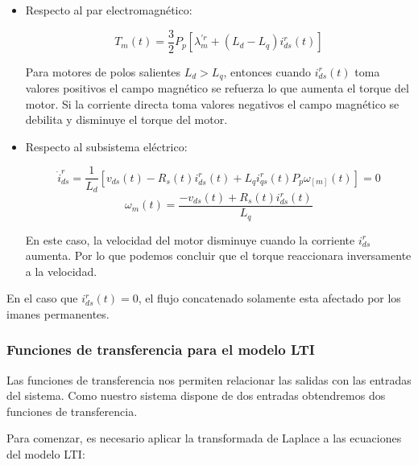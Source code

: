 \documentclass{article}
\begin{document}
\begin{itemize}
    
    \item Respecto al par electromagnético:

    \begin{equation}
        T_{m}(t) = \frac{3}{2}P_{p}[\lambda_{m}^{\prime r} + (L_{d}-L_{q})i_{ds}^r(t)]
    \end{equation}

    Para motores de polos salientes $L_{d} > L_{q}$, entonces cuando $i_{ds}^r(t)$
    toma valores positivos el campo magnético se refuerza lo que aumenta el torque del
    motor. Si la corriente directa toma valores negativos el campo magnético se debilita 
    y disminuye el torque del motor. 

    \item Respecto al subsistema eléctrico:

    \begin{equation}
        \dot{i}_{ds}^r = \frac{1}{L_{d}}[v_{ds}(t) - R_{s}(t)i_{ds}^r(t) + L_{q}i_{qs}^r(t)P_{p}\omega_[m](t)] = 0
    \end{equation}
    \begin{equation}
        \omega_{m}(t) = \frac{-v_{ds}(t) + R_{s}(t)i_{ds}^r(t)}{L_{q}}
    \end{equation}

    En este caso, la velocidad del motor disminuye cuando la corriente $i_{ds}^r$ 
    aumenta. Por lo que podemos concluir que el torque reaccionara inversamente 
    a la velocidad.

\end{itemize}

En el caso que $i_{ds}^r(t) = 0$, el flujo concatenado solamente esta afectado por 
los imanes permanentes.


\subsubsection{Funciones de transferencia para el modelo LTI}

Las funciones de transferencia nos permiten relacionar las salidas con las entradas del sistema.
Como nuestro sistema dispone de dos entradas obtendremos dos funciones de transferencia.

Para comenzar, es necesario aplicar la transformada de Laplace a las ecuaciones del modelo LTI:
\end{document}
